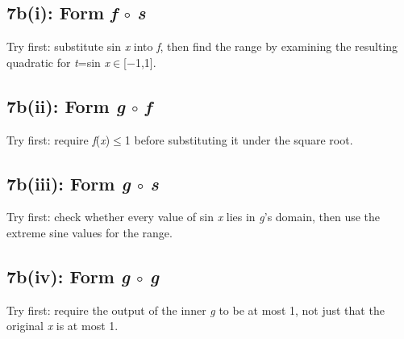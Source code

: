 \documentclass[11pt]{article}
\begin{document}
\begin{keepsection}
\begin{keepsection}
\end{keepsection}

\begin{keepsection}
\subsection{7b(i): Form \textit{f} \ensuremath{\circ} \textit{s}}

Try first: substitute sin \textit{x} into \textit{f}, then find the range by examining the resulting quadratic for \textit{t}=sin \textit{x}\ensuremath{\in}[\ensuremath{-}1,1].

\end{keepsection}

\begin{keepsection}
\subsection{7b(ii): Form \textit{g} \ensuremath{\circ} \textit{f}}

Try first: require \textit{f}(\textit{x})\ensuremath{\leq}1 before substituting it under the square root.

\end{keepsection}

\begin{keepsection}
\subsection{7b(iii): Form \textit{g} \ensuremath{\circ} \textit{s}}

Try first: check whether every value of sin \textit{x} lies in \textit{g}’s domain, then use the extreme sine values for the range.

\end{keepsection}

\begin{keepsection}
\subsection{7b(iv): Form \textit{g} \ensuremath{\circ} \textit{g}}

Try first: require the output of the inner \textit{g} to be at most 1, not just that the original \textit{x} is at most 1.

\end{keepsection}
\end{keepsection}
\end{document}
